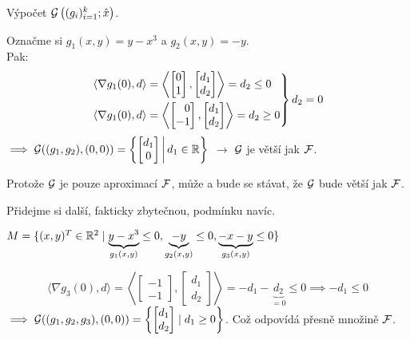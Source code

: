 Výpočet $\mathcal{G}\left( (g_i)_{i=1}^k; \hat x\right)$.

Označme si $g_1(x, y) = y-x^3$ a $g_2(x, y) = -y$.\\
Pak: 
\[
    \begin{rcases*}
        \langle \nabla g_1(0), d \rangle = \left\langle 
        \begin{bmatrix}
            0 \\
            1
        \end{bmatrix},
        \begin{bmatrix}
            d_1 \\
            d_2
        \end{bmatrix}\right\rangle = d_2 \leq 0\\
        \langle \nabla g_1(0), d \rangle = \left\langle 
        \begin{bmatrix}
            \phantom{-}0 \\
            -1
        \end{bmatrix},
        \begin{bmatrix}
            d_1 \\
            d_2
        \end{bmatrix}\right\rangle = d_2 \geq 0
    \end{rcases*} d_2 = 0
\]
$\implies \mathcal{G}((g_1, g_2), (0, 0)) = \left\lbrace 
\begin{bmatrix}
    d_1 \\
    0    
\end{bmatrix} \, \middle| \, d_1 \in \mathbb{R} \right\rbrace$ $\rightarrow$ $\mathcal{G}$ je větší jak $\mathcal{F}$. 

Protože $\mathcal{G}$ je pouze aproximací $\mathcal{F}$, může a bude se stávat, že $\mathcal{G}$ bude větší jak $\mathcal{F}$.

Přidejme si další, fakticky zbytečnou, podmínku navíc.

$M = \{(x, y)^T \in \mathbb{R}^2 \mid \underbrace{y - x^3}_{g_1(x, y)} \leq 0, \underbrace{-y}_{g_2(x,y)} \leq 0, 
\underbrace{-x -y}_{g_3(x,y)} \leq 0\}$

\[
    \langle \nabla g_3(0), d\rangle = \left\langle 
    \begin{bmatrix}
        -1 \\
        -1
    \end{bmatrix},
    \begin{bmatrix}
        d_1 \\
        d_2
    \end{bmatrix}
    \right\rangle = -d_1 - \underbrace{d_2}_{=0} \leq 0 \implies -d_1 \leq 0
\]
$\implies \mathcal{G}((g_1, g_2, g_3), (0,0)) = \left\lbrace 
\begin{bmatrix}
    d_1 \\
    d_2    
\end{bmatrix} \mid d_1 \geq 0 \right\rbrace$. Což odpovídá přesně množině $\mathcal{F}$.

